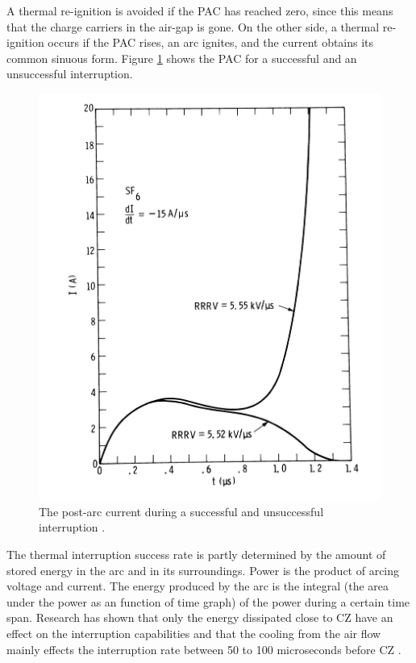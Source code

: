 \documentclass[10pt,b5paper,twoside]{article}
\begin{document}
A thermal re-ignition is avoided if the PAC has reached zero, since this means that the charge carriers in the air-gap is gone. On the other side, a thermal re-ignition occurs if the PAC rises, an arc ignites, and the current obtains its common sinuous form. Figure \ref{fig:PACbreakandreIgnite} shows the PAC for a successful and an unsuccessful interruption. 

\begin{figure} [H]
\centering
\includegraphics[scale=0.7]{Bilder/Theory/failSuccPAC.png}
\caption{The post-arc current during a successful and unsuccessful interruption \cite{bib:CIHVN}.} \label{fig:PACbreakandreIgnite}
\end{figure}

The thermal interruption success rate is partly determined by the amount of stored energy in the arc and in its surroundings. Power is the product of arcing voltage and current. The energy produced by the arc is the integral (the area under the power as an function of time graph) of the power during a certain time span. Research has shown that only the energy dissipated close to CZ have an effect on the interruption capabilities and that the cooling from the air flow mainly effects the interruption rate between 50 to 100 microseconds before CZ \cite{bib:CIHVN}.
\end{document}
